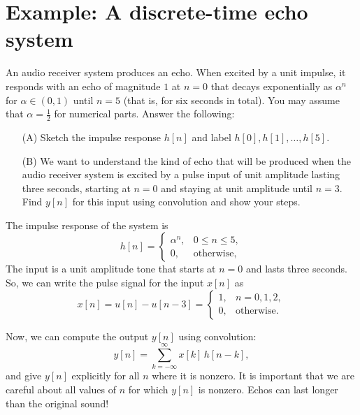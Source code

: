 \documentclass{ee102_notes}
\begin{document}
\section{Example: A discrete-time echo system}
An audio receiver system produces an echo. When excited by a unit impulse, it responds with an echo of magnitude $1$ at $n=0$ that decays exponentially as $\alpha^n$ for $\alpha \in (0,1)$ until $n=5$ (that is, for six seconds in total). You may assume that $\alpha = \tfrac{1}{2}$ for numerical parts. Answer the following:
\begin{enumerate}
    \item[(A)] Sketch the impulse response $h[n]$ and label $h[0], h[1], \ldots, h[5]$.
    \item[(B)] We want to understand the kind of echo that will be produced when the audio receiver system is excited by a pulse input of unit amplitude lasting three seconds, starting at $n=0$ and staying at unit amplitude until $n=3$. Find $y[n]$ for this input using convolution and show your steps.
\end{enumerate}
The impulse response of the system is
\[
h[n]=
\begin{cases}
\alpha^{n}, & 0\le n\le 5,\\
0, & \text{otherwise,}
\end{cases}
\]
The input is a unit amplitude tone that starts at $n=0$ and lasts three seconds. So, we can write the pulse signal for the input $x[n]$ as
\[
x[n]=u[n]-u[n-3]=
\begin{cases}
1, & n=0,1,2,\\
0, & \text{otherwise.}
\end{cases}
\]

Now, we can compute the output $y[n]$ using convolution:
\[
y[n]=\sum_{k=-\infty}^{\infty} x[k]\,h[n-k],
\]
and give $y[n]$ explicitly for all $n$ where it is nonzero. It is important that we are careful about all values of $n$ for which $y[n]$ is nonzero. Echos can last longer than the original sound!
\end{document}
